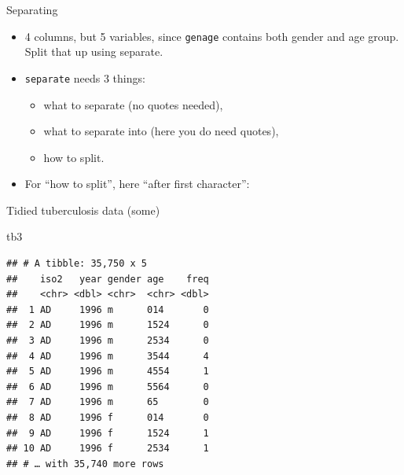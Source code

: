 \documentclass[
  ignorenonframetext,
]{beamer}
\newenvironment{Shaded}{\begin{snugshade}}{\end{snugshade}}
\newcommand{\DecValTok}[1]{\textcolor[rgb]{0.00,0.00,0.81}{#1}}
\newcommand{\KeywordTok}[1]{\textcolor[rgb]{0.13,0.29,0.53}{\textbf{#1}}}
\newcommand{\NormalTok}[1]{#1}
\newcommand{\OperatorTok}[1]{\textcolor[rgb]{0.81,0.36,0.00}{\textbf{#1}}}
\newcommand{\StringTok}[1]{\textcolor[rgb]{0.31,0.60,0.02}{#1}}
\providecommand{\tightlist}{%
  \setlength{\itemsep}{0pt}\setlength{\parskip}{0pt}}
\begin{document}
\begin{frame}[fragile]{Separating}
\protect\hypertarget{separating}{}

\begin{itemize}
\tightlist
\item
  4 columns, but 5 variables, since \texttt{genage} contains both gender
  and age group. Split that up using separate.
\item
  \texttt{separate} needs 3 things:

  \begin{itemize}
  \tightlist
  \item
    what to separate (no quotes needed),
  \item
    what to separate into (here you do need quotes),
  \item
    how to split.
  \end{itemize}
\item
  For ``how to split'', here ``after first character'':
\end{itemize}

\begin{Shaded}
\end{Shaded}

\end{frame}

\begin{frame}[fragile]{Tidied tuberculosis data (some)}
\protect\hypertarget{tidied-tuberculosis-data-some}{}

\begin{Shaded}
\begin{Highlighting}[]
\NormalTok{tb3}
\end{Highlighting}
\end{Shaded}

\begin{verbatim}
## # A tibble: 35,750 x 5
##    iso2   year gender age    freq
##    <chr> <dbl> <chr>  <chr> <dbl>
##  1 AD     1996 m      014       0
##  2 AD     1996 m      1524      0
##  3 AD     1996 m      2534      0
##  4 AD     1996 m      3544      4
##  5 AD     1996 m      4554      1
##  6 AD     1996 m      5564      0
##  7 AD     1996 m      65        0
##  8 AD     1996 f      014       0
##  9 AD     1996 f      1524      1
## 10 AD     1996 f      2534      1
## # … with 35,740 more rows
\end{verbatim}

\end{frame}
\end{document}

